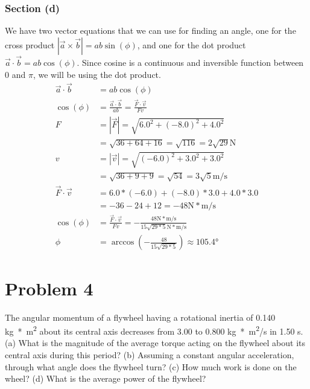 \documentclass[12pt]{article}
\begin{document}
\subsubsection{Section (d)}
We have two vector equations that we can use for finding an angle, one for the cross product \(\left|\vec{a}\times\vec{b}\right| = ab\sin(\phi)\), and one for the dot product \(\vec{a}\cdot\vec{b} = ab\cos(\phi)\). Since cosine is a continuous and inversible function between 0 and $\pi$, we will be using the dot product.
\begin{align}
    \vec{a}\cdot\vec{b} &=  ab\cos(\phi)\\
    \cos(\phi)  &=  \frac{\vec{a}\cdot\vec{b}}{ab}
        =   \frac{\vec{F}\cdot\vec{v}}{Fv}\\
    F   &=  \left|\vec{F}\right|
        =   \sqrt{6.0^2 + (-8.0)^2 + 4.0^2}\\
        &=  \sqrt{36 + 64 + 16}
        =   \sqrt{116}
        =   2\sqrt{29}\unit{\newton}\\
    v   &=  \left|\vec{v}\right|
        =   \sqrt{(-6.0)^2 + 3.0^2 + 3.0^2}\\
        &=  \sqrt{36 + 9 + 9}
        =   \sqrt{54}
        =   3\sqrt{5}\unit{\meter/\second}\\
    \vec{F}\cdot\vec{v} &=  6.0*(-6.0) + (-8.0)*3.0 + 4.0*3.0\\
        &=  - 36 - 24 + 12
        =   -48\unit{\newton*\meter/\second}\\
    \cos(\phi)  &=  \frac{\vec{F}\cdot\vec{v}}{Fv}
        =   -\frac{48\unit{\newton*\meter/\second}}{15\sqrt{29*5}\unit{\newton*\meter/\second}}\\
    \phi    &=  \arccos\left(-\frac{48}{15\sqrt{29*5}}\right)
        \approx \boxed{105.4\unit{\degree}}
\end{align}

\pagebreak
\section{Problem 4}
The angular momentum of a flywheel having a rotational inertia of 0.140 \unit{\kilo\gram*\meter^2} about its central axis decreases from 3.00 to 0.800 \unit{\kilo\gram*\meter^2/\second} in 1.50 \unit{\second}. (a) What is the magnitude of the average torque acting on the flywheel about its central axis during this period? (b) Assuming a constant angular acceleration, through what angle does the flywheel turn? (c) How much work is done on the wheel? (d) What is the average power of the flywheel?
\end{document}
